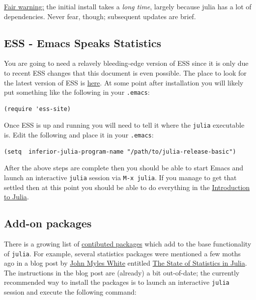 \documentclass[11pt]{article}
\begin{document}
\underline{Fair warning:} the initial install takes a \emph{long time}, largely
because julia has a lot of dependencies. Never fear, though;
subsequent updates are brief.
\subsection[ESS - Emacs Speaks Statistics]{ESS - Emacs Speaks Statistics}
\label{sec-1-2}

You are going to need a relavely bleeding-edge version of ESS since it
is only due to recent ESS changes that this document is even possible.
The place to look for the latest version of ESS is \href{http://stat.ethz.ch/ESS/index.php?Section=download}{here}.  At some
point after installation you will likely put something like the
following in your \texttt{.emacs}:

\begin{verbatim}
(require 'ess-site)
\end{verbatim}

Once ESS is up and running you will need to tell it where the \texttt{julia}
executable is. Edit the following and place it in your \texttt{.emacs}:

\begin{verbatim}
(setq  inferior-julia-program-name "/path/to/julia-release-basic")
\end{verbatim}

After the above steps are complete then you should be able to start
Emacs and launch an interactive \texttt{julia} session via \texttt{M-x julia}.  If
you manage to get that settled then at this point you should be able
to do everything in the \href{file://intro-julia.org}{Introduction to Julia}.
\subsection[Add-on packages]{Add-on packages}
\label{sec-1-3}

There is a growing list of \href{http://docs.julialang.org/en/release-0.1/packages/packagelist/}{contibuted packages} which add to the base
functionality of \texttt{julia}.  For example, several statistics packages
were mentioned a few moths ago in a blog post by \href{https://github.com/johnmyleswhite}{John Myles White}
entitled \href{http://www.johnmyleswhite.com/notebook/2012/12/02/the-state-of-statistics-in-julia/}{The State of Statistics in Julia}.  The instructions in the
blog post are (already) a bit out-of-date; the currently recommended
way to install the packages is to launch an interactive \texttt{julia}
session and execute the following command:
\end{document}

